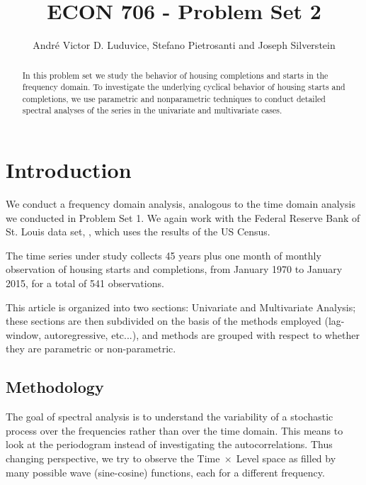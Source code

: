 \documentclass[12pt]{article} %
\begin{document}
\title{ECON 706 - Problem Set 2}
\author{Andr\'e Victor D. Luduvice, Stefano Pietrosanti and Joseph Silverstein}

\maketitle

\begin{abstract}
In this problem set we study the behavior of housing completions and starts in the frequency domain. To investigate the underlying cyclical behavior of housing starts and completions, we use parametric and nonparametric techniques to conduct  detailed spectral analyses of the series in the univariate and multivariate cases.

\end{abstract}

\section{Introduction}

We conduct a frequency domain analysis, analogous to the time domain analysis we conducted in Problem Set 1. We again work with the Federal Reserve Bank of St. Louis data set, \citep{dataset}, which uses the results of the US Census.

The time series under study collects 45 years plus one month of monthly observation of housing starts and completions, from January 1970 to January 2015, for a total of 541 observations.

This article is organized into two sections: Univariate and Multivariate Analysis; these sections are then subdivided on the basis of the methods employed (lag-window, autoregressive, etc...), and methods are grouped with respect to whether they are parametric or non-parametric.

\subsection*{Methodology}

The goal of spectral analysis is to understand the variability of a stochastic process over the frequencies rather than over the time domain. This means to look at the periodogram instead of investigating the autocorrelations. Thus changing perspective, we try to observe the Time$\;\times\;$Level space as filled by many possible wave (sine-cosine) functions, each for a different frequency.
\end{document}
